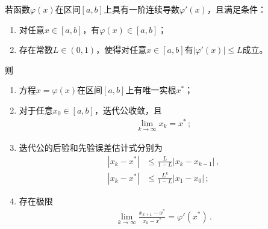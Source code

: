 \begin{theorem}[全局收敛性定理]
    若函数$\varphi(x)$在区间$[a,b]$上具有一阶连续导数$\varphi'(x)$，且满足条件：
    \begin{enumerate}
        \item 对任意$x\in[a,b]$，有$\varphi(x)\in[a,b]$；
        \item 存在常数$L\in(0,1)$，使得对任意$x\in[a,b]$有$|\varphi'(x)|\le L$成立。
    \end{enumerate}
    则
    \begin{enumerate}
        \item 方程$x=\varphi(x)$在区间$[a,b]$上有唯一实根$x^*$；
        \item 对于任意$x_0\in[a,b]$，迭代公收敛，且\begin{align}\label{eq:02ex0308}
                  \lim\limits_{k\rightarrow\infty}{x_k}=x^*\, ;
              \end{align}
        \item 迭代公的后验和先验误差估计式分别为
              \begin{align}
                  |x_k-x^*| & \le\frac{L}{1-L}|x_k-x_{k-1}|\, , \label{eq:02ex0309} \\
                  |x_k-x^*| & \le\frac{L^k}{1-L}|x_1-x_0|\, ;\label{eq:02ex0310}
              \end{align}
        \item 存在极限\begin{align}\label{eq:02ex0311}
                  \lim\limits_{k\rightarrow\infty}{\frac{x_{k+1}-x^*}{x_k-x^*}}=\varphi'(x^*)\, .
              \end{align}
    \end{enumerate}
\end{theorem}
